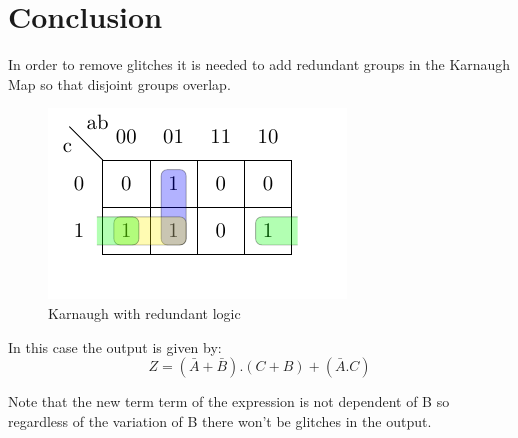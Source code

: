 \section*{Conclusion}
In order to remove glitches it is needed to add redundant groups in the
Karnaugh Map so that disjoint groups overlap.
\begin{figure}[H] 
    \begin{center}
    \includegraphics{data/karnaugh_improved.pdf}
    \end{center}
    \caption{Karnaugh with redundant logic}
    \label{fig:karnaugh_improved}
    \end{figure} 
In this case the output is given by:
\begin{equation*}
    Z= (\bar{A}+\bar{B}).(C+B)+(\bar{A}.C)    
\end{equation*} 

Note that the new term term of the expression is not dependent
of B so regardless of the variation of B there won't be glitches
in the output.

